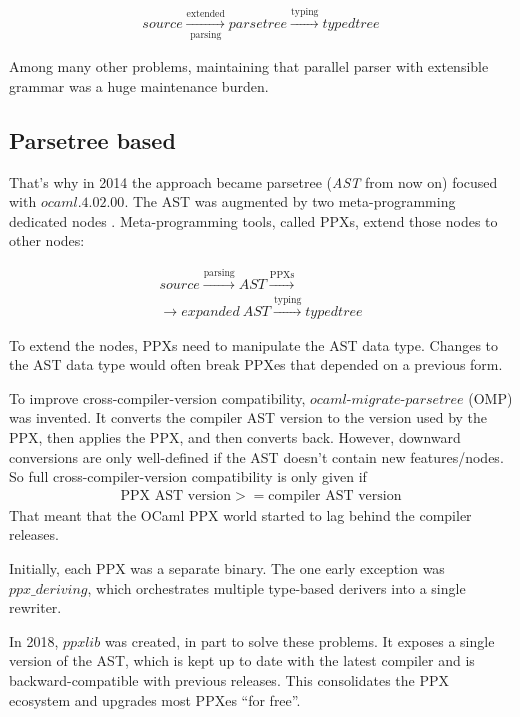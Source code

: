\documentclass[10pt, a4paper, twocolumn]{article}
\begin{document}
\begin{align*}
source \xrightarrow[\text{parsing}]{\text{extended}} parsetree \xrightarrow{\text{typing}} typedtree
\end{align*}

Among many other problems, maintaining that parallel parser with extensible
grammar was a huge maintenance burden.


\subsection{Parsetree based}

That's why in 2014 the approach became parsetree (\emph{AST} from now on)
focused with $ocaml.4.02.00$. The AST was augmented by two meta-programming
dedicated nodes \cite{extension_nodes}\cite{attributes}. Meta-programming tools,
called PPXs, extend those nodes to other nodes:

\begin{gather*}
source \xrightarrow{\text{parsing}} AST \xrightarrow{\text{PPXs}}\\
\rightarrow expanded\ AST\xrightarrow{\text{typing}} typedtree
\end{gather*}

To extend the nodes, PPXs need to manipulate the AST data type. Changes to the
AST data type would often break PPXes that depended on a previous form.

To improve cross-compiler-version compatibility, $ocaml\mbox{-}migrate\mbox{-}parsetree$
(OMP)\cite{omp} was invented. It converts the compiler AST version to the
version used by the PPX, then applies the PPX, and then converts back. However,
downward conversions are only well-defined if the AST doesn't contain new
features/nodes. So full cross-compiler-version compatibility is only given if
\begin{align*}
\text{PPX\ AST\ version} >= \text{compiler\ AST\ version}
\end{align*}
That meant that the OCaml PPX world started to lag behind the compiler releases.

Initially, each PPX was a separate binary. The one early exception was $ppx \_
deriving$, which orchestrates multiple type-based derivers into a single
rewriter.

In 2018, $ppxlib$\cite{ppxlib} was created, in part to solve these problems. It
exposes a single version of the AST, which is kept up to date with the latest
compiler and is backward-compatible with previous releases. This consolidates
the PPX ecosystem and upgrades most PPXes ``for free''.
\end{document}
